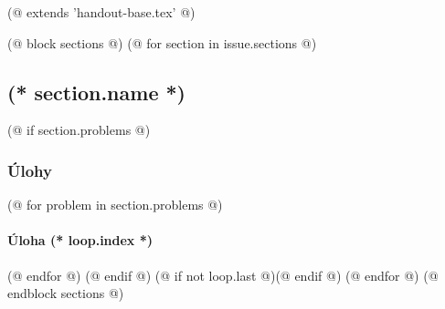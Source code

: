 (@ extends 'handout-base.tex' @)

(@ block sections @)
    (@ for section in issue.sections @)
        \subsection{(* section.name *)}
        (@ if section.problems @)
            \subsubsection{Úlohy}
            (@ for problem in section.problems @)
                \paragraph{Úloha (* loop.index *)}
            (@ endfor @)
        (@ endif @)
        (@ if not loop.last @)\newpage(@ endif @)
    (@ endfor @)
(@ endblock sections @)
